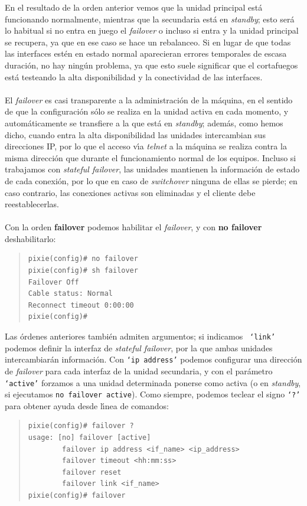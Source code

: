 En el resultado de la orden anterior vemos que la unidad principal est\'a
funcionando normalmente, mientras que la secundaria est\'a en {\it standby}; 
esto ser\'a lo habitual si no entra en juego el {\it failover} o incluso si
entra y la unidad principal se recupera, ya que en ese caso se hace un 
rebalanceo. Si en lugar de que todas las interfaces est\'en en estado normal
aparecieran errores temporales de escasa duraci\'on, no hay ning\'un problema, 
ya que esto suele significar que el cortafuegos est\'a testeando la alta 
disponibilidad y la conectividad de las interfaces.\\
\\El {\it failover} es casi transparente a la administraci\'on de la m\'aquina,
en el sentido de que la configuraci\'on s\'olo se realiza en la unidad activa
en cada momento, y autom\'aticamente se transfiere a la que est\'a en {\it 
standby}; adem\'as, como hemos dicho, cuando entra la alta disponibilidad las 
unidades intercambian sus direcciones IP, por lo que el acceso v\'{\i}a {\it 
telnet} a la m\'aquina se realiza contra la misma direcci\'on que durante el 
funcionamiento normal de los equipos. Incluso si trabajamos con {\it stateful 
failover}, las unidades mantienen la informaci\'on de estado de cada 
conexi\'on, por lo que en caso de {\it switchover} ninguna de ellas se pierde; 
en caso contrario, las conexiones activas son eliminadas y el cliente debe 
reestablecerlas.\\
\\Con la orden {\bf failover} podemos habilitar el {\it failover}, y con {\bf
no failover} deshabilitarlo:
\begin{quote}
\begin{verbatim}
pixie(config)# no failover
pixie(config)# sh failover
Failover Off
Cable status: Normal
Reconnect timeout 0:00:00
pixie(config)# 
\end{verbatim}
\end{quote}
Las \'ordenes anteriores tambi\'en admiten argumentos; si indicamos {\tt 
`link'} podemos definir la interfaz de {\it stateful failover}, por la que 
ambas unidades intercambiar\'an informaci\'on. Con {\tt `ip address'} podemos 
configurar una direcci\'on de {\it failover} para cada interfaz de la unidad
secundaria, y con el par\'ametro {\tt `active'} forzamos a una unidad 
determinada ponerse como activa (o en {\it standby}, si ejecutamos {\tt no 
failover active}). Como siempre, podemos teclear el signo {\tt `?'} para 
obtener ayuda desde l\'{\i}nea de comandos:
\begin{quote}
\begin{verbatim}
pixie(config)# failover ?
usage: [no] failover [active]
        failover ip address <if_name> <ip_address>
        failover timeout <hh:mm:ss>
        failover reset
        failover link <if_name>
pixie(config)# failover 
\end{verbatim}
\end{quote}
